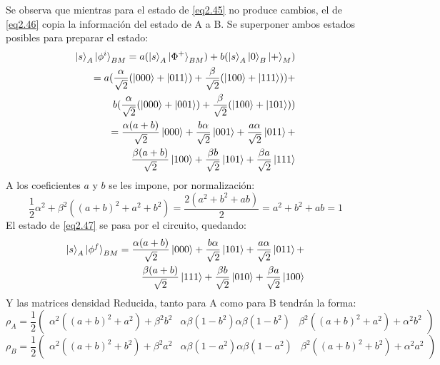 \documentclass{book}
\begin{document}
Se observa que mientras para el estado de \ref{eq2.45} no produce cambios, el de \ref{eq2.46} copia la información del estado de A a B. Se superponer ambos estados posibles para preparar el estado:
\begin{equation}\label{eq2.47}\begin{aligned}{\ket{s}_A\ket{\phi^{i}}_{BM}=a(\ket{s}_A\ket{\Phi^+}_{BM})+b(\ket{s}_A\ket{0}_B\ket{+}_M)} \\ {=a(\frac{\alpha}{\sqrt{2}}(\ket{000}+\ket{011})+\frac{\beta}{\sqrt{2}}(\ket{100}+\ket{111}))+}\\ {b(\frac{\alpha}{\sqrt{2}}(\ket{000}+\ket{001})+\frac{\beta}{\sqrt{2}}(\ket{100}+\ket{101}))}\\   {=\frac{\alpha(a+b)}{\sqrt{2}}\ket{000}+\frac{b\alpha}{\sqrt{2}}\ket{001}+\frac{a\alpha}{\sqrt{2}}\ket{011}+} \\  {\frac{\beta(a+b)}{\sqrt{2}}\ket{100}+\frac{\beta b}{\sqrt{2}}\ket{101}+\frac{\beta a}{\sqrt{2}}\ket{111}}\end{aligned}\end{equation}
A los coeficientes $a$ y $b$ se les impone, por normalización:
\begin{equation}\label{eq2.48}{\frac{1}{2}\alpha^2+\beta^2((a+b)^2+a^2+b^2)=\frac{2(a^2+b^2+ab)}{2}=a^2+b^2+ab=1}\end{equation}
El estado de \ref{eq2.47} se pasa por el circuito, quedando:
\begin{equation}\label{eq2.49}\begin{aligned}{\ket{s}_A\ket{\phi^{f}}_{BM}
=\frac{\alpha(a+b)}{\sqrt{2}}\ket{000}+\frac{b\alpha}{\sqrt{2}}\ket{101}+\frac{a\alpha}{\sqrt{2}}\ket{011}+} \\ {\frac{\beta(a+b)}{\sqrt{2}}\ket{111}+\frac{\beta b}{\sqrt{2}}\ket{010}+\frac{\beta a}{\sqrt{2}}\ket{100}}\end{aligned}\end{equation}
Y las matrices densidad Reducida, tanto para A como para B tendrán la forma:
\begin{equation}\label{eq2.50}{\rho_A=\frac{1}{2}\begin{pmatrix}\alpha^2((a+b)^2+a^2)+\beta^2 b^2 & \alpha\beta(1-b^2)  \alpha\beta(1-b^2) & \beta^2((a+b)^2+a^2)+\alpha^2 b^2 \end{pmatrix}}\end{equation}
\begin{equation}\label{eq2.51}{\rho_B=\frac{1}{2}\begin{pmatrix}\alpha^2((a+b)^2+b^2)+\beta^2 a^2 & \alpha\beta(1-a^2)  \alpha\beta(1-a^2) & \beta^2((a+b)^2+b^2)+\alpha^2 a^2 \end{pmatrix}}\end{equation}
\end{document}
